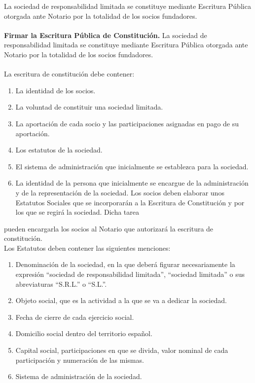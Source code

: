 La sociedad de responsabilidad limitada se constituye mediante Escritura Pública otorgada ante Notario por la totalidad de los socios fundadores.\\
\\
\textbf{Firmar la Escritura Pública de Constitución.}
La sociedad de responsabilidad limitada se constituye mediante Escritura Pública otorgada ante Notario por la totalidad de los socios fundadores.
\\
\\
La escritura de constitución debe contener:
\begin{enumerate}
\item La identidad de los socios.
\item La voluntad de constituir una sociedad limitada.
\item La aportación de cada socio y las participaciones asignadas en pago de su aportación.
\item Los estatutos de la sociedad.
\item El sistema de administración que inicialmente se establezca para la sociedad.
\item La identidad de la persona que inicialmente se encargue de la administración y de la representación de la sociedad.
Los socios deben elaborar unos Estatutos Sociales que se incorporarán a la Escritura de Constitución y por los que se regirá la sociedad. Dicha tarea
\end{enumerate}
pueden encargarla los socios al Notario que autorizará la escritura de constitución.\\
Los Estatutos deben contener las siguientes menciones:
\begin{enumerate}
\item Denominación de la sociedad, en la que deberá figurar necesariamente la expresión “sociedad de responsabilidad limitada”, “sociedad limitada” o sus abreviaturas “S.R.L.” o “S.L.”.
\item Objeto social, que es la actividad a la que se va a dedicar la sociedad.
\item Fecha de cierre de cada ejercicio social.
\item Domicilio social dentro del territorio español.
\item Capital social, participaciones en que se divida, valor nominal de cada participación y numeración de las mismas.
\item Sistema de administración de la sociedad.
\end{enumerate}

